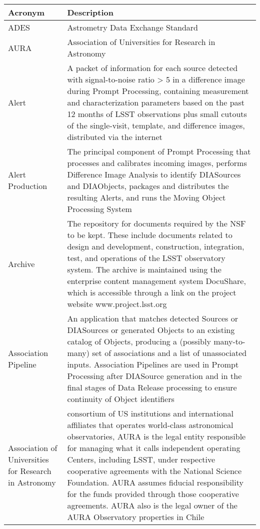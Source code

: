 \addtocounter{table}{-1}
\begin{longtable}{|p{}|p{}|}\hline
\textbf{Acronym} & \textbf{Description}  \\\hline

ADES & Astrometry Data Exchange Standard \\\hline
AURA & \gls{Association of Universities for Research in Astronomy} \\\hline
Alert & A packet of information for each source detected with signal-to-noise ratio > 5 in a difference image during \gls{Prompt Processing}, containing measurement and characterization parameters based on the past 12 months of \gls{LSST} observations plus small cutouts of the single-visit, template, and difference images, distributed via the internet \\\hline
Alert Production & The principal component of \gls{Prompt Processing} that processes and calibrates incoming images, performs \gls{Difference Image} Analysis to identify DIASources and DIAObjects, packages and distributes the resulting Alerts, and runs the \gls{Moving Object Processing System} \\\hline
Archive & The repository for documents required by the \gls{NSF} to be kept. These include documents related to design and development, construction, integration, test, and operations of the \gls{LSST} observatory system. The archive is maintained using the enterprise content management system \gls{DocuShare}, which is accessible through a link on the project website www.project.lsst.org \\\hline
Association Pipeline & An application that matches detected Sources or DIASources or generated Objects to an existing catalog of Objects, producing a (possibly many-to-many) set of associations and a list of unassociated inputs. Association Pipelines are used in \gls{Prompt Processing} after \gls{DIASource} generation and in the final stages of \gls{Data Release} processing to ensure continuity of \gls{Object} identifiers \\\hline
Association of Universities for Research in Astronomy &  consortium of \gls{US} institutions and international affiliates that operates world-class astronomical observatories, \gls{AURA} is the legal entity responsible for managing what it calls independent operating Centers, including \gls{LSST}, under respective cooperative agreements with the \gls{National Science Foundation}. \gls{AURA} assumes fiducial responsibility for the funds provided through those cooperative agreements. \gls{AURA} also is the legal owner of the \gls{AURA} Observatory properties in Chile \\\hline

\end{longtable}
